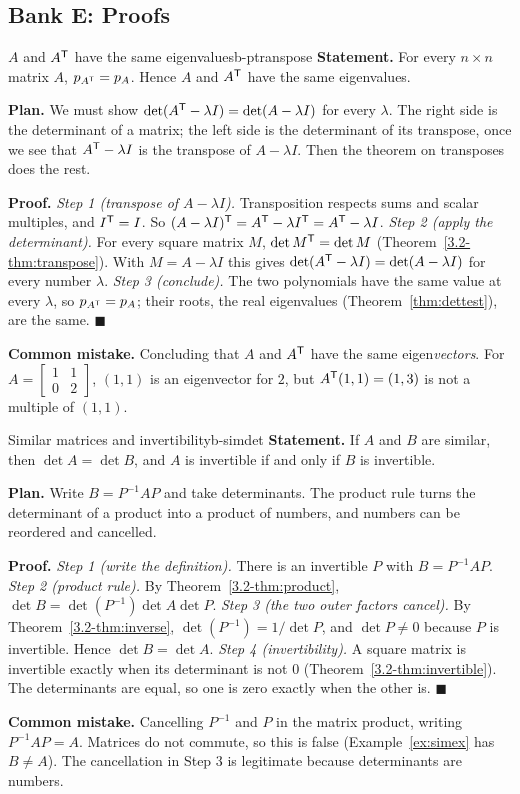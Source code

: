 \documentclass[11pt]{article}
\begin{document}
\subsection*{Bank E: Proofs}
\begin{exmp}{$A$ and $A^{\mathsf T}$ have the same eigenvalues}{b-ptranspose}
\textbf{Statement.} For every $n\times n$ matrix $A$, $p_{A^{\mathsf T}}=p_A$. Hence $A$ and $A^{\mathsf T}$ have the same eigenvalues.

\textbf{Plan.} We must show $\det(A^{\mathsf T}-\lambda I)=\det(A-\lambda I)$ for every $\lambda$. The right side is the determinant of a matrix; the left side is the determinant of its transpose, once we see that $A^{\mathsf T}-\lambda I$ is the transpose of $A-\lambda I$. Then the theorem on transposes does the rest.

\textbf{Proof.}
\emph{Step 1 (transpose of $A-\lambda I$).} Transposition respects sums and scalar multiples, and $I^{\mathsf T}=I$. So $(A-\lambda I)^{\mathsf T}=A^{\mathsf T}-\lambda I^{\mathsf T}=A^{\mathsf T}-\lambda I$.
\emph{Step 2 (apply the determinant).} For every square matrix $M$, $\det M^{\mathsf T}=\det M$ (Theorem~\ref{3.2-thm:transpose}). With $M=A-\lambda I$ this gives $\det(A^{\mathsf T}-\lambda I)=\det(A-\lambda I)$ for every number $\lambda$.
\emph{Step 3 (conclude).} The two polynomials have the same value at every $\lambda$, so $p_{A^{\mathsf T}}=p_A$; their roots, the real eigenvalues (Theorem~\ref{thm:dettest}), are the same. \qquad$\blacksquare$

\textbf{Common mistake.} Concluding that $A$ and $A^{\mathsf T}$ have the same eigen\emph{vectors}. For $A=\begin{bmatrix}1&1\\0&2\end{bmatrix}$, $(1,1)$ is an eigenvector for $2$, but $A^{\mathsf T}(1,1)=(1,3)$ is not a multiple of $(1,1)$.
\end{exmp}

\begin{exmp}{Similar matrices and invertibility}{b-simdet}
\textbf{Statement.} If $A$ and $B$ are similar, then $\det A=\det B$, and $A$ is invertible if and only if $B$ is invertible.

\textbf{Plan.} Write $B=P^{-1}AP$ and take determinants. The product rule turns the determinant of a product into a product of numbers, and numbers can be reordered and cancelled.

\textbf{Proof.}
\emph{Step 1 (write the definition).} There is an invertible $P$ with $B=P^{-1}AP$.
\emph{Step 2 (product rule).} By Theorem~\ref{3.2-thm:product}, $\det B=\det(P^{-1})\det A\det P$.
\emph{Step 3 (the two outer factors cancel).} By Theorem~\ref{3.2-thm:inverse}, $\det(P^{-1})=1/\det P$, and $\det P\neq0$ because $P$ is invertible. Hence $\det B=\det A$.
\emph{Step 4 (invertibility).} A square matrix is invertible exactly when its determinant is not $0$ (Theorem~\ref{3.2-thm:invertible}). The determinants are equal, so one is zero exactly when the other is. \qquad$\blacksquare$

\textbf{Common mistake.} Cancelling $P^{-1}$ and $P$ in the matrix product, writing $P^{-1}AP=A$. Matrices do not commute, so this is false (Example~\ref{ex:simex} has $B\neq A$). The cancellation in Step 3 is legitimate because determinants are numbers.
\end{exmp}
\end{document}
